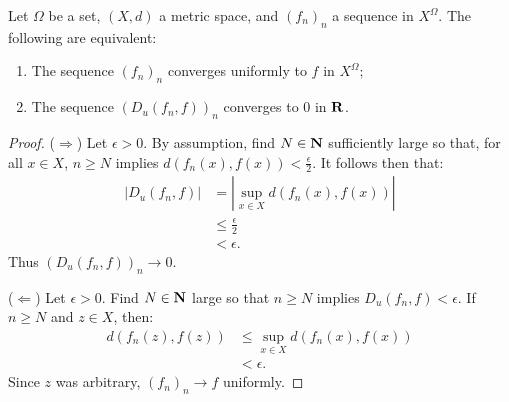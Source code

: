 \documentclass[11pt,twoside,openany]{memoir}
\begin{document}
    \begin{proposition}
        Let $\Omega$ be a set, $(X,d)$ a metric space, and $(f_n)_n$ a sequence in $X^\Omega$. The following are equivalent:
            \begin{enumerate}[label = (\arabic*),itemsep=1pt,topsep=3pt]
                \item The sequence $(f_n)_n$ converges uniformly to $f$ in $X^\Omega$;
                \item The sequence $(D_u(f_n,f))_n$ converges to 0 in $\mathbf{R}$.
            \end{enumerate}
    \end{proposition}
        \begin{proof}
            ($\Rightarrow$) Let $\epsilon > 0$. By assumption, find $N \in \mathbf{N}$ sufficiently large so that, for all $x \in X$, $n \geq N$ implies $d(f_n(x),f(x)) < \frac{\epsilon}{2}$. It follows then that:
                \begin{equation*}
                \begin{split}
                    |D_u(f_n,f)|
                    & = \left| \sup_{x \in X}d(f_n(x),f(x)) \right| \\
                    & \leq \frac{\epsilon}{2} \\
                    & < \epsilon.
                \end{split}
                \end{equation*}
            Thus $(D_u(f_n,f))_n \rightarrow 0$.

            ($\Leftarrow$) Let $\epsilon > 0$. Find $N \in \mathbf{N}$ large so that $n \geq N$ implies $D_u(f_n,f) < \epsilon$. If $n \geq N$ and $z \in X$, then:
                \begin{equation*}
                \begin{split}
                    d(f_n(z),f(z))
                    & \leq \sup_{x \in X}d(f_n(x),f(x)) \\
                    & < \epsilon.
                \end{split}
                \end{equation*}
            Since $z$ was arbitrary, $(f_n)_n \rightarrow f$ uniformly.
        \end{proof}
\end{document}
